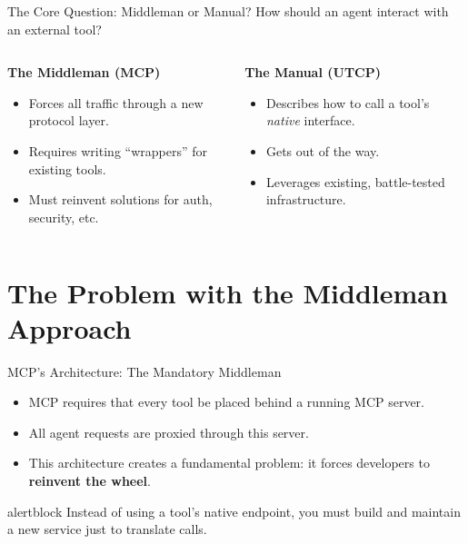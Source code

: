 \documentclass{beamer}
\begin{document}
\begin{frame}{The Core Question: Middleman or Manual?}
  How should an agent interact with an external tool?
  \vfill
  \begin{columns}[T]
    \begin{column}{0.5\textwidth}
      \centering
      \textbf{The Middleman (MCP)}
      \begin{itemize}
        \item Forces all traffic through a new protocol layer.
        \item Requires writing ``wrappers'' for existing tools.
        \item Must reinvent solutions for auth, security, etc.
      \end{itemize}
    \end{column}
    \begin{column}{0.5\textwidth}
      \centering
      \textbf{The Manual (UTCP)}
      \begin{itemize}
        \item Describes how to call a tool's \textit{native} interface.
        \item Gets out of the way.
        \item Leverages existing, battle-tested infrastructure.
      \end{itemize}
    \end{column}
  \end{columns}
\end{frame}

\section{The Problem with the Middleman Approach}

\begin{frame}{MCP's Architecture: The Mandatory Middleman}
  \begin{itemize}
    \item MCP requires that every tool be placed behind a running MCP server.
    \item All agent requests are proxied through this server.
    \item This architecture creates a fundamental problem: it forces developers to \textbf{reinvent the wheel}.
  \end{itemize}
  \vfill
  \begin{beamercolorbox}[sep=1em,wd=\textwidth]{alertblock}
    Instead of using a tool's native endpoint, you must build and maintain a new service just to translate calls.
  \end{beamercolorbox}
\end{frame}
\end{document}
